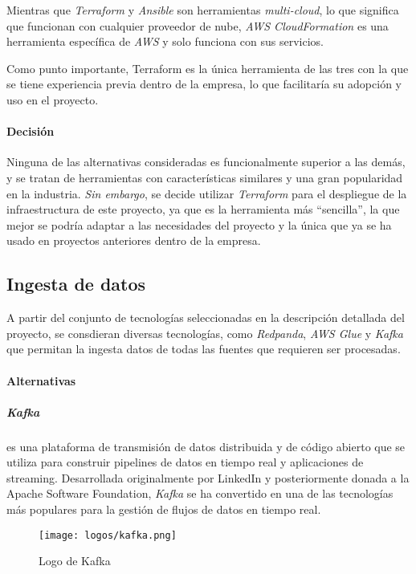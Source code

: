 Mientras que \textit{Terraform} y \textit{Ansible} son herramientas
\textit{multi-cloud}, lo que significa que funcionan con cualquier proveedor de
nube, \textit{AWS CloudFormation} es una herramienta específica de \textit{AWS}
y solo funciona con sus servicios.

Como punto importante, Terraform es la única herramienta de las tres con la que
se tiene experiencia previa dentro de la empresa, lo que facilitaría su
adopción y uso en el proyecto.

\paragraph{Decisión}
Ninguna de las alternativas consideradas es funcionalmente superior a las demás,
y se tratan de herramientas con características similares y una gran popularidad
en la industria. \textit{Sin embargo}, se decide utilizar \textit{Terraform}
para el despliegue de la infraestructura de este proyecto, ya que es la
herramienta más ``sencilla'', la que mejor se podría adaptar a las necesidades
del proyecto y la única que ya se ha usado en proyectos anteriores dentro de la
empresa.


\newpage{}
\subsection{Ingesta de datos}\label{subsec:alt_ingesta}
A partir del conjunto de tecnologías seleccionadas en la descripción detallada
del proyecto, se consdieran diversas tecnologías, como \textit{Redpanda},
\textit{AWS Glue} y \textit{Kafka} que permitan la ingesta datos de todas las
fuentes que requieren ser procesadas.

\paragraph{Alternativas}
\subparagraph{Kafka} es una plataforma de transmisión de datos distribuida y de
código abierto que se utiliza para construir pipelines de datos en tiempo real y
aplicaciones de streaming. Desarrollada originalmente por LinkedIn y
posteriormente donada a la Apache Software Foundation, \textit{Kafka} se ha
convertido en una de las tecnologías más populares para la gestión de flujos de
datos en tiempo real.

\begin{figure}[H]
	\centering
	\texttt{[image: logos/kafka.png]}
	\caption{Logo de Kafka~\textregistered}
	\label{fig:kafka}
\end{figure}

